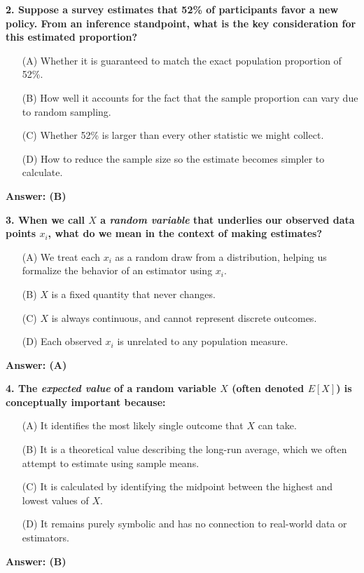 \documentclass[12pt]{article}
\begin{document}
\bigskip

\textbf{2. Suppose a survey estimates that 52\% of participants favor a new policy. From an inference standpoint, what is the key consideration for this estimated proportion?}
\begin{enumerate}
\item[(A)] Whether it is guaranteed to match the exact population proportion of 52\%.
\item[(B)] How well it accounts for the fact that the sample proportion can vary due to random sampling.
\item[(C)] Whether 52\% is larger than every other statistic we might collect.
\item[(D)] How to reduce the sample size so the estimate becomes simpler to calculate.
\end{enumerate}
\textbf{Answer: (B)}

\bigskip

\textbf{3. When we call $X$ a \emph{random variable} that underlies our observed data points $x_i$, what do we mean in the context of making estimates?}
\begin{enumerate}
\item[(A)] We treat each $x_i$ as a random draw from a distribution, helping us formalize the behavior of an estimator using $x_i$.
\item[(B)] $X$ is a fixed quantity that never changes.
\item[(C)] $X$ is always continuous, and cannot represent discrete outcomes.
\item[(D)] Each observed $x_i$ is unrelated to any population measure.
\end{enumerate}
\textbf{Answer: (A)}

\bigskip

\textbf{4. The \emph{expected value} of a random variable $X$ (often denoted $E[X]$) is conceptually important because:}
\begin{enumerate}
\item[(A)] It identifies the most likely single outcome that $X$ can take.
\item[(B)] It is a theoretical value describing the long-run average, which we often attempt to estimate using sample means.
\item[(C)] It is calculated by identifying the midpoint between the highest and lowest values of $X$.
\item[(D)] It remains purely symbolic and has no connection to real-world data or estimators.
\end{enumerate}
\textbf{Answer: (B)}
\end{document}
